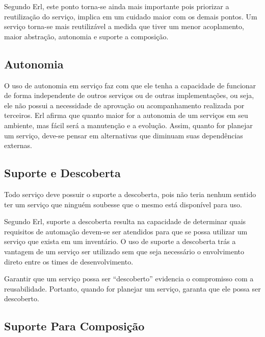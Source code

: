 \documentclass[12pt]{article}
\begin{document}
Segundo Erl, este ponto torna-se ainda mais importante pois priorizar a reutilização do serviço, implica em um cuidado maior com os demais pontos. Um serviço torna-se mais reutilizável a medida que tiver um menor acoplamento, maior abstração, autonomia e suporte a composição.


\subsection{Autonomia} %
\label{sub:autonomia}

O uso de autonomia em serviço faz com que ele tenha a capacidade de funcionar de forma independente de outros serviços ou de outras implementações, ou seja, ele não possui a necessidade de aprovação ou acompanhamento realizada por terceiros.
Erl afirma que quanto maior for a autonomia de um serviços em seu ambiente, mas fácil será a manutenção e a evolução. Assim, quanto for planejar um serviço, deve-se pensar em alternativas que diminuam suas dependências externas.


\subsection{Suporte e Descoberta} %
\label{sub:suporte_e_descoberta}

Todo serviço deve possuir o suporte a descoberta, pois não teria nenhum sentido ter um serviço que ninguém soubesse que o mesmo está disponível para uso.

Segundo Erl, suporte a descoberta resulta na capacidade de determinar quais requisitos de automação devem-se ser atendidos para que se possa utilizar um serviço que exista em um inventário.
O uso de suporte a descoberta trás a vantagem de um serviço ser utilizado sem que seja necessário o envolvimento direto entre os times de desenvolvimento.

Garantir que um serviço possa ser “descoberto” evidencia o compromisso com a reusabilidade. Portanto, quando for planejar um serviço, garanta que ele possa ser descoberto.



\subsection{Suporte Para Composição} %
\label{sub:suporte_para_composi_o}
\end{document}
